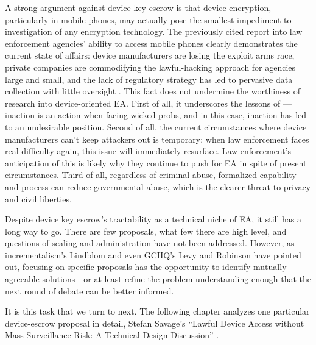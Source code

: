 A strong argument against device key escrow is that device encryption, particularly in mobile phones, may actually pose
the smallest impediment to investigation of any encryption technology. The previously cited report into law enforcement
agencies' ability to access mobile phones clearly demonstrates the current state of affairs: device manufacturers are
losing the exploit arms race, private companies are commodifying the \ac{lawful-hacking} approach for agencies large and
small, and the lack of regulatory strategy has led to pervasive data collection with little oversight
\cite{koepke_2020}. This fact does not undermine the worthiness of research into device-oriented \ac{EA}. First of all,
it underscores the lessons of ---inaction is an action when facing \acp{wicked-prob}, and in this
case, inaction has led to an undesirable position. Second of all, the current circumstances where device manufacturers
can't keep attackers out is temporary; when law enforcement faces real difficulty again, this issue will immediately
resurface. Law enforcement's anticipation of this is likely why they continue to push for \ac{EA} in spite of present
circumstances. Third of all, regardless of criminal abuse, formalized capability and process can reduce governmental
abuse, which is the clearer threat to privacy and civil liberties.

Despite device key escrow's tractability as a technical niche of \ac{EA}, it still has a long way to go. There are few
proposals, what few there are high level, and questions of scaling and administration have not been addressed. However,
as \ac{incrementalism}'s Lindblom and even \ac{GCHQ}'s Levy and Robinson have pointed out, focusing on specific
proposals has the opportunity to identify mutually agreeable solutions---or at least refine the problem understanding
enough that the next round of debate can be better informed.

It is this task that we turn to next. The following chapter analyzes one particular device-escrow proposal in detail,
Stefan Savage's ``Lawful Device Access without Mass Surveillance Risk: A Technical Design Discussion''
\cite{savage_lawful_2018}.
